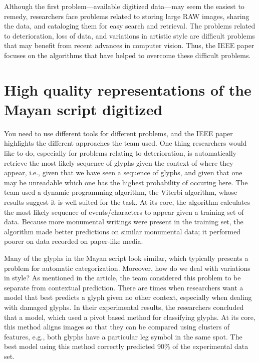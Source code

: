 \documentclass[a4paper,twoside,twocolumn]{article}
\begin{document}
Although the  first problem---available digitized data---may  seem the
easiest to remedy, researchers face  problems related to storing large
RAW images, sharing the data, and  cataloging them for easy search and
retrieval. The  problems related to  deterioration, loss of  data, and
variations in artistic  style are difficult problems  that may benefit
from recent advances in computer  vision. Thus, the IEEE paper focuses
on  the  algorithms  that  have helped  to  overcome  these  difficult
problems.

\section{High quality representations of the Mayan script digitized}
\label{sec-3}
You need to  use different tools for different problems,  and the IEEE
paper highlights  the different approaches  the team used.   One thing
researchers  would like  to do,  especially for  problems relating  to
deterioration, is  automatically retrieve the most  likely sequence of
glyphs given  the context of  where they  appear, i.e., given  that we
have seen a  sequence of glyphs, and given that  one may be unreadable
which one has the highest probability  of occuring here. The team used
a dynamic programming algorithm,  the Viterbi algorithm, whose results
suggest it  is well suited for  the task.  At its  core, the algorithm
calculates  the most  likely sequence  of events/characters  to appear
given a  training set of  data. Because more monumental  writings were
present in the training set,  the algorithm made better predictions on
similar  monumental data;  it  performed poorer  on  data recorded  on
paper-like media.

Many of the  glyphs in the Mayan script look  similar, which typically
presents a problem  for automatic categorization. Moreover,  how do we
deal with variations in style?  As  mentioned in the article, the team
considered  this problem  to be  separate from  contextual prediction.
There are  times when researchers  want a  model that best  predicts a
glyph given  no other  context, especially  when dealing  with damaged
glyphs.  In their experimental results, the researchers concluded that
a model, which  used a pivot based method for  classifying glyphs.  At
its core, this method aligns images so that they can be compared using
clusters of features,  e.g., both glyphs have a  particular leg symbol
in the same spot. The best model using this method correctly predicted
90\% of the experimental data set.
\end{document}
